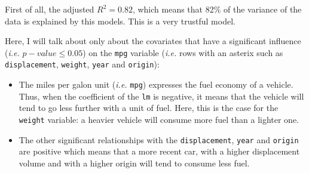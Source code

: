 \documentclass[
  12pt,
  oneside]{report}
\begin{document}
First of all, the adjusted \(R^2 = 0.82\), which means that 82\% of the variance of the data is explained by this models. This is a very trustful model.

Here, I will talk about only about the covariates that have a significant influence (\emph{i.e.} \(p-value \leq 0.05\)) on the \texttt{mpg} variable (\emph{i.e.} rows with an asterix such as \texttt{displacement}, \texttt{weight}, \texttt{year} and \texttt{origin}):

\begin{itemize}
\item
  The miles per galon unit (\emph{i.e.} \texttt{mpg}) expresses the fuel economy of a vehicle. Thus, when the coefficient of the \texttt{lm} is negative, it means that the vehicle will tend to go less further with a unit of fuel. Here, this is the case for the \texttt{weight} variable: a heavier vehicle will consume more fuel than a lighter one.
\item
  The other significant relationships with the \texttt{displacement}, \texttt{year} and \texttt{origin} are positive which means that a more recent car, with a higher displacement volume and with a higher origin will tend to consume less fuel.
\end{itemize}

\newpage

\hypertarget{section-1}{%
\section{}\label{section-1}}
\end{document}
